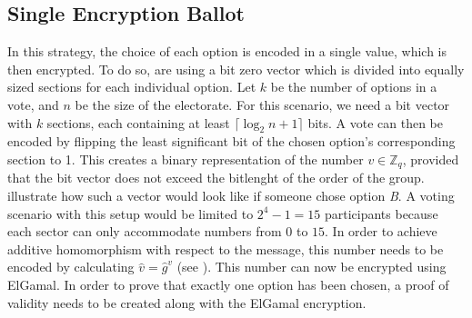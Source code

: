 \documentclass[numbers=noenddot, abstract=on, a4paper, headsepline,
footsepline, oneside, draft=off]{scrreprt}
\newcommand{\myref}[1]{(see \Vref{#1})}
\begin{document}

\subsection{Single Encryption Ballot}
\label{sec:singleencriptionballot}
In this strategy, the choice of each option is encoded in a single value, which
is then encrypted. To do so, are using a bit zero vector which is divided
into equally sized sections for each individual option. Let $k$ be the number of
options in a vote, and $n$ be the size of the electorate. For this scenario, we need a bit
vector with $k$ sections, each containing at least $\lceil\log_2 n+1\rceil$
bits.
A vote can then be encoded by flipping the least significant bit of the
chosen option's corresponding section to 1. This creates a binary representation
of the number $v \in \mathbb{Z}_q$, provided that the bit
vector does not exceed the bitlenght of the order of the group.
 illustrate how such a vector would look like
if someone chose option \emph{B}. A voting scenario with this setup would be
limited to $2^4-1=15$ participants because each sector can only accommodate
numbers from $0$ to $15$. In order to achieve additive homomorphism with respect
to the message, this number needs to be encoded by calculating $\hat{v}=\hat{g}^{v}$ \myref{sec:expelgamal}.
This number can now be encrypted using ElGamal. In order to prove that exactly one
option has been chosen, a proof of validity needs to be created along with the
ElGamal encryption.
\end{document}
